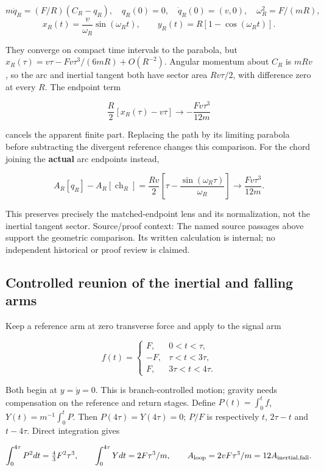 \documentclass[11pt,a4paper]{article}
\begin{document}
\[m\ddot q_R=(F/R)(C_R-q_R),\quad q_R(0)=0,\quad\dot q_R(0)=(v,0),
\quad\omega_R^2=F/(mR),\]
\[x_R(t)=\frac v{\omega_R}\sin(\omega_Rt),\qquad
y_R(t)=R[1-\cos(\omega_Rt)].\]

They converge on compact time intervals to the parabola, but
\(x_R(\tau)=v\tau-Fv\tau^3/(6mR)+O(R^{-2})\). Angular momentum about
\(C_R\) is \(mRv\), so the arc and inertial tangent both have sector
area \(Rv\tau/2\), with difference zero at every \(R\). The endpoint
term

\[\frac R2[x_R(\tau)-v\tau]\longrightarrow-\frac{Fv\tau^3}{12m}\]

cancels the apparent finite part. Replacing the path by its limiting
parabola before subtracting the divergent reference changes this
comparison. For the chord joining the \textbf{actual} arc endpoints
instead,

\[A_R[q_R]-A_R[\operatorname{ch}_R]
 =\frac{Rv}2\left[\tau-\frac{\sin(\omega_R\tau)}{\omega_R}\right]
 \longrightarrow\frac{Fv\tau^3}{12m}.\]

This preserves precisely the matched-endpoint lens and its
normalization, not the inertial tangent sector. Source/proof context:
The named source passages above support the geometric comparison. Its
written calculation is internal; no independent historical or proof
review is claimed.

\subsection{Controlled reunion of the inertial and falling
arms}\label{controlled-reunion-of-the-inertial-and-falling-arms}

Keep a reference arm at zero transverse force and apply to the signal
arm

\[f(t)=\begin{cases}F,&0<t<\tau,\\-F,&\tau<t<3\tau,\\
F,&3\tau<t<4\tau.\end{cases}\]

Both begin at \(y=\dot y=0\). This is branch-controlled motion; gravity
needs compensation on the reference and return stages. Define
\(P(t)=\int_0^tf\), \(Y(t)=m^{-1}\int_0^tP\). Then
\(P(4\tau)=Y(4\tau)=0\); \(P/F\) is respectively \(t\), \(2\tau-t\) and
\(t-4\tau\). Direct integration gives

\[\int_0^{4\tau}P^2dt=\tfrac43F^2\tau^3,\qquad
\int_0^{4\tau}Ydt=2F\tau^3/m,\qquad
A_{\rm loop}=2vF\tau^3/m=12A_{\rm inertial,fall}.\]
\end{document}
